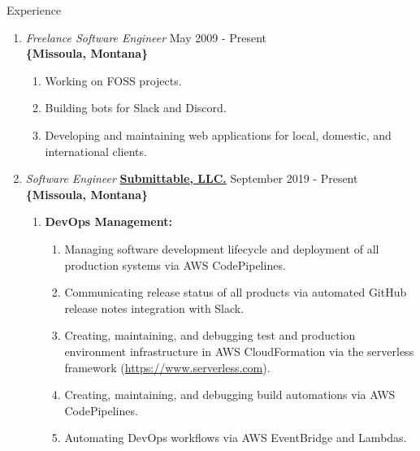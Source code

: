 \documentclass[oneside]{article}%
\begin{document}
 
\onecolumn


\renewcommand{\footrulewidth}{1pt}


\noindent
\huge{Experience}
\small
\begin{enumerate}[]
	\item \textit{Freelance Software Engineer} \hfill May 2009 - Present\\
		\textbf{\{Missoula, Montana\}}
		\begin{enumerate}[*]
			\item Working on FOSS projects.
			\item Building bots for Slack and Discord.
			\item Developing and maintaining web applications for local, domestic, and international clients.
		\end{enumerate}
	\item \textit{Software Engineer} \textbf{\href{https://submittable.com}{Submittable, LLC.}} \hfill September 2019 - Present\\
		\textbf{\{Missoula, Montana\}}
		\begin{enumerate}[]
			\item \textbf{DevOps Management:}
				\begin{enumerate}[-]
					\item Managing software development lifecycle and deployment of all production systems via AWS CodePipelines.
					\item Communicating release status of all products via automated GitHub release notes integration with Slack.
					\item Creating, maintaining, and debugging test and production environment infrastructure in AWS CloudFormation via the serverless framework (\href{https://www.serverless.com/}{https://www.serverless.com}).
					\item Creating, maintaining, and debugging build automations via AWS CodePipelines.
					\item Automating DevOps workflows via AWS EventBridge and Lambdas.

\end{enumerate}
\end{enumerate}
\end{enumerate}
\end{document}
